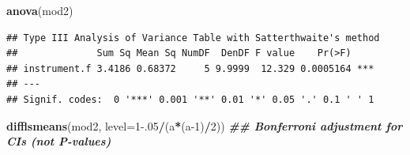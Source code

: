\documentclass[
]{book}
\newenvironment{Shaded}{\begin{snugshade}}{\end{snugshade}}
\newcommand{\AttributeTok}[1]{\textcolor[rgb]{0.13,0.29,0.53}{#1}}
\newcommand{\DecValTok}[1]{\textcolor[rgb]{0.00,0.00,0.81}{#1}}
\newcommand{\DocumentationTok}[1]{\textcolor[rgb]{0.56,0.35,0.01}{\textbf{\textit{#1}}}}
\newcommand{\FloatTok}[1]{\textcolor[rgb]{0.00,0.00,0.81}{#1}}
\newcommand{\FunctionTok}[1]{\textcolor[rgb]{0.13,0.29,0.53}{\textbf{#1}}}
\newcommand{\NormalTok}[1]{#1}
\newcommand{\SpecialCharTok}[1]{\textcolor[rgb]{0.81,0.36,0.00}{\textbf{#1}}}
\begin{document}
\begin{Shaded}
\begin{Highlighting}[]
\FunctionTok{anova}\NormalTok{(mod2)}
\end{Highlighting}
\end{Shaded}

\begin{verbatim}
## Type III Analysis of Variance Table with Satterthwaite's method
##              Sum Sq Mean Sq NumDF  DenDF F value    Pr(>F)    
## instrument.f 3.4186 0.68372     5 9.9999  12.329 0.0005164 ***
## ---
## Signif. codes:  0 '***' 0.001 '**' 0.01 '*' 0.05 '.' 0.1 ' ' 1
\end{verbatim}

\begin{Shaded}
\begin{Highlighting}[]
\FunctionTok{difflsmeans}\NormalTok{(mod2, }\AttributeTok{level=}\DecValTok{1}\FloatTok{{-}.05}\SpecialCharTok{/}\NormalTok{(a}\SpecialCharTok{*}\NormalTok{(a}\DecValTok{{-}1}\NormalTok{)}\SpecialCharTok{/}\DecValTok{2}\NormalTok{)) }\DocumentationTok{\#\# Bonferroni adjustment for CI\textquotesingle{}s (not P{-}values)}
\end{Highlighting}
\end{Shaded}
\end{document}
